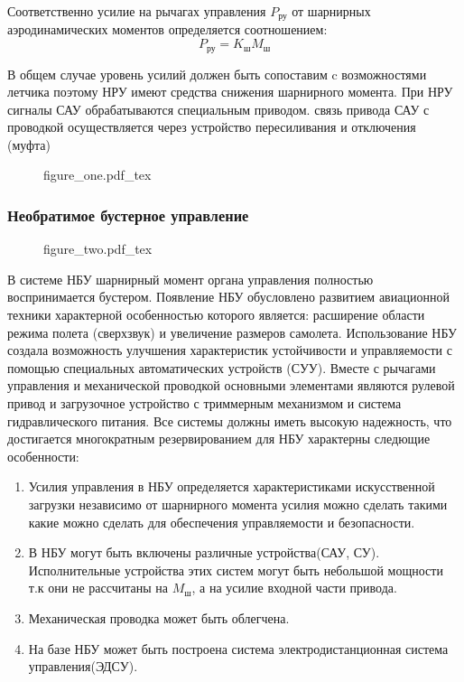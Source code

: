 \documentclass{article}
\begin{document}
Соответственно усилие на рычагах управления $P_\text{ру}$ от шарнирных
аэродинамических моментов определяется соотношением:
\[
	P_\text{ру} = K_\text{ш} M_\text{ш}
\]

В общем случае уровень усилий должен быть сопоставим c возможностями летчика
поэтому НРУ имеют средства снижения шарнирного момента. При НРУ сигналы САУ
обрабатываются специальным приводом. связь привода САУ с проводкой
осуществляется через устройство пересиливания и отключения (муфта)


\begin{figure}[ht]
	{figure_one.pdf_tex}
\end{figure}

\subsubsection{Необратимое бустерное управление}

\begin{figure}[ht]
	{figure_two.pdf_tex}
\end{figure}

В системе НБУ шарнирный момент органа управления полностью воспринимается
бустером. Появление НБУ обусловлено развитием авиационной техники характерной
особенностью которого является: расширение области режима полета (сверхзвук) и
увеличение размеров самолета. Использование НБУ создала возможность улучшения
характеристик устойчивости и управляемости с помощью специальных автоматических
устройств (СУУ). Вместе с рычагами управления и механической проводкой
основными элементами являются рулевой привод и загрузочное устройство с
триммерным механизмом и система гидравлического питания. Все системы должны
иметь высокую надежность, что достигается многократным резервированием для НБУ
характерны следющие особенности:
\begin{enumerate}
	\item Усилия управления в НБУ определяется характеристиками искусственной
	      загрузки независимо от шарнирного момента усилия можно сделать такими
	      какие можно сделать для обеспечения управляемости и безопасности.
	\item В НБУ могут быть включены различные устройства(САУ, СУ).
	      Исполнительные устройства этих систем могут быть небольшой мощности т.к
	      они не рассчитаны на $M_\text{ш}$, а на усилие входной части привода.
	\item Механическая проводка может быть облегчена.
	\item На базе НБУ может быть построена система электродистанционная система
	      управления(ЭДСУ).
\end{enumerate}
\end{document}
